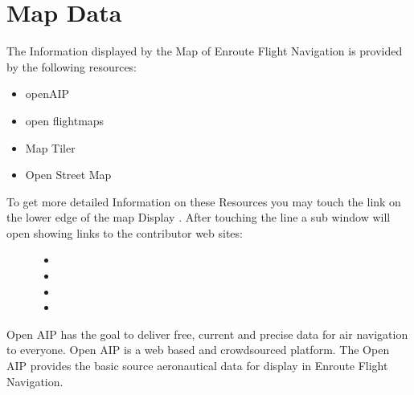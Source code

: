 \documentclass[letterpaper,10pt,english]{sphinxmanual}
\begin{document}
\chapter{Map Data}
\label{\detokenize{03-reference/map_data:map-data}}\label{\detokenize{03-reference/map_data::doc}}
\sphinxAtStartPar
The Information displayed by the Map of Enroute Flight Navigation is provided by the following resources:
\begin{itemize}
\item {} 
\sphinxAtStartPar
openAIP

\item {} 
\sphinxAtStartPar
open flightmaps

\item {} 
\sphinxAtStartPar
Map Tiler

\item {} 
\sphinxAtStartPar
Open Street Map

\end{itemize}
\begin{description}
\item[{To get more detailed Information on these Resources you may touch the link on the lower edge of the map Display . After touching the line  a sub window will open showing links to the contributor web sites:}] \leavevmode\begin{itemize}
\item {} 
\sphinxAtStartPar
{}

\item {} 
\sphinxAtStartPar
{}

\item {} 
\sphinxAtStartPar
{}

\item {} 
\sphinxAtStartPar
{}

\end{itemize}

\end{description}

\sphinxAtStartPar
{}

\sphinxAtStartPar
Open AIP has the goal to deliver free, current and precise data for air navigation to everyone. Open AIP is a web based and crowd\sphinxhyphen{}sourced platform.
The Open AIP provides the basic source aeronautical data for display in Enroute Flight Navigation.
\end{document}
